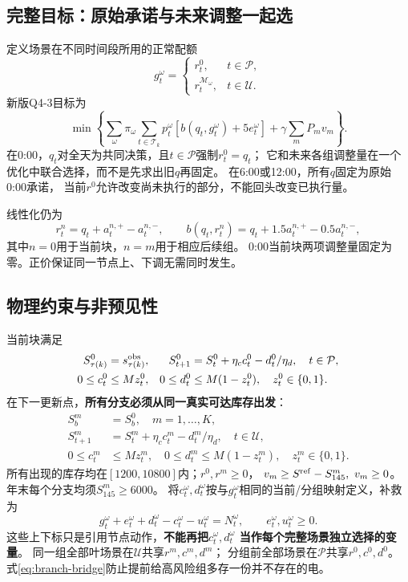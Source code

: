 \documentclass[UTF8,11pt]{ctexart}
\begin{document}
\subsection{完整目标：原始承诺与未来调整一起选}
定义场景在不同时间段所用的正常配额
\begin{equation}
 g_t^\omega=\begin{cases}
 r_t^0,&t\in\mathcal P,\\
 r_t^{\mathcal M_\omega},&t\in\mathcal U.
 \end{cases}
\end{equation}
新版Q4-3目标为
\begin{equation}\label{eq:lookahead-main}
 \min\left\{\sum_\omega\pi_\omega\sum_{t\in\mathcal T_k}
 p_t^\omega[b(q_t,g_t^\omega)+5e_t^\omega]
       +\gamma\sum_mP_mv_m\right\}.
\end{equation}
在0:00，$q_t$对全天为共同决策，且$t\in\mathcal P$强制$r_t^0=q_t$；
它和未来各组调整量在一个优化中联合选择，而不是先求出旧$q$再固定。
在6:00或12:00，所有$q$固定为原始0:00承诺，
当前$r^0$允许改变尚未执行的部分，不能回头改变已执行量。

线性化仍为
\begin{equation}
 r_t^n=q_t+a_t^{n,+}-a_t^{n,-},\qquad
 b(q_t,r_t^n)=q_t+1.5a_t^{n,+}-0.5a_t^{n,-},
\end{equation}
其中$n=0$用于当前块，$n=m$用于相应后续组。
0:00当前块两项调整量固定为零。正价保证同一节点上、下调无需同时发生。

\subsection{物理约束与非预见性}
当前块满足
\begin{align}
 S_{\tau(k)}^0&=s_{\tau(k)}^{\rm obs},&
 S_{t+1}^0&=S_t^0+\eta_c c_t^0-d_t^0/\eta_d,\quad t\in\mathcal P,\\
 0\leq c_t^0&\leq Mz_t^0,&
 0\leq d_t^0&\leq M(1-z_t^0),\quad z_t^0\in\{0,1\}.
\end{align}
在下一更新点，\textbf{所有分支必须从同一真实可达库存出发}：
\begin{align}
 S_b^m&=S_b^0,\quad m=1,\ldots,K,\label{eq:branch-bridge}\\
 S_{t+1}^m&=S_t^m+\eta_c c_t^m-d_t^m/\eta_d,\quad t\in\mathcal U,\\
 0\leq c_t^m&\leq Mz_t^m,\quad
 0\leq d_t^m\leq M(1-z_t^m),\quad z_t^m\in\{0,1\}.
\end{align}
所有出现的库存均在$[1200,10800]$内；$r^0,r^m\geq0$，
$v_m\geq S^{\rm ref}-S_{145}^m,\ v_m\geq0$。
年末每个分支均须$S_{145}^m\geq6000$。
将$c_t^\omega,d_t^\omega$按与$g_t^\omega$相同的当前/分组映射定义，补救为
\begin{equation}
 g_t^\omega+e_t^\omega+d_t^\omega-c_t^\omega-u_t^\omega
       =N_t^\omega,\qquad e_t^\omega,u_t^\omega\geq0 .
\end{equation}
这些上下标只是引用节点动作，\textbf{不能再把$c_t^\omega,d_t^\omega$
当作每个完整场景独立选择的变量}。
同一组全部叶场景在$\mathcal U$共享$r^m,c^m,d^m$；
分组前全部场景在$\mathcal P$共享$r^0,c^0,d^0$。
式\eqref{eq:branch-bridge}防止提前给高风险组多存一份并不存在的电。
\end{document}
